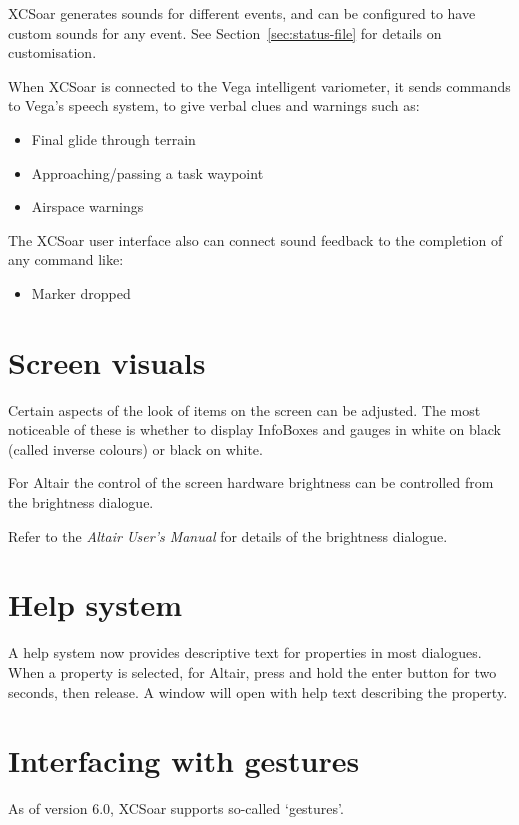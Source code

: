 XCSoar generates sounds for different events, and can be configured to
have custom sounds for any event.  See Section~\ref{sec:status-file} for
details on customisation.

When XCSoar is connected to the Vega intelligent variometer, it sends
commands to Vega's speech system, to give verbal clues and warnings such as:
\begin{itemize}
\item Final glide through terrain
\item Approaching/passing a task waypoint
\item Airspace warnings
\end{itemize}

The XCSoar user interface also can connect sound feedback to the completion 
of any command like:
\begin{itemize}
\item Marker dropped
\end{itemize}


\section{Screen visuals}

Certain aspects of the look of items on the screen can be adjusted.
The most noticeable of these is whether to display InfoBoxes and
gauges in white on black (called inverse colours) or black on white.

For Altair the control of the screen hardware 
brightness can be controlled from the brightness dialogue.
\begin{quote}
\blink{}
\end{quote}

Refer to the {\em Altair User's Manual} for details of the brightness
dialogue.


\section{Help system}

A help system now provides descriptive text for properties in
most dialogues.  When a property is selected, for Altair, press and hold the
enter button for two seconds, then release.  A window will open with
help text describing the property.

\section{Interfacing with gestures}\label{sec:gestures}
As of version 6.0, XCSoar supports so-called `gestures'.

